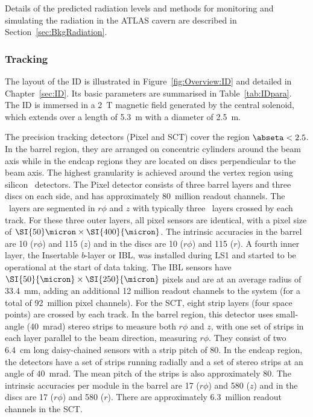 \documentclass[cernpreprint, atlasdraft=false, UKenglish,british,orcidlogo, texmf, orcidlogo]{atlasdoc}
\begin{document}
Details of the predicted \RunThr radiation levels and methods for monitoring and simulating the radiation in the ATLAS cavern are described in Section~\ref{sec:BkgRadiation}.
 
 
 
 
\subsubsection{Tracking}
\label{subsec:OverviewTracking}
The layout of the \gls{ID} is illustrated in Figure~\ref{fig:Overview:ID} and detailed in
Chapter~\ref{sec:ID}. Its
basic parameters  are summarised in Table~\ref{tab:IDpara}.
The \gls{ID} is immersed in a \SI{2}{\tesla} magnetic field generated by the
central solenoid, which extends over a length of \SI{5.3}{\m} with
a diameter of \SI{2.5}{\m}.
 
The precision tracking detectors (\gls{Pixel} and \gls{SCT}) cover
the region $\abseta<2.5$. In the barrel region, they are arranged on concentric
cylinders around the beam axis while in the endcap regions they are located
on discs perpendicular to the beam axis.
The highest granularity is achieved around the vertex
region using silicon \pixel\  detectors. The \ATLAS \gls{Pixel} detector consists of three barrel layers and three discs on each side, and has
approximately 80~million readout channels.  The \pixel\ layers are segmented in $r\phi$ and $z$ with typically
three \pixel\  layers crossed by each track. For these three outer layers, all pixel sensors are identical, with a pixel size of $\SI{50}\micron
\times \SI{400}{\micron}$. The intrinsic accuracies in the barrel
are \SI{10}{\micron} ($r\phi$) and \SI{115}{\micron} ($z$) and in the discs
are \SI{10}{\micron} ($r\phi$) and \SI{115}{\micron} ($r$). A fourth inner layer, the Insertable $b$-layer or \gls{IBL}, was installed during \gls{LS1} and started to be operational at the start of \RunTwo data taking. The \gls{IBL} sensors have $\SI{50}{\micron} \times \SI{250}{\micron}$ pixels and are at an average radius of \SI{33.4}{\mm}, adding an additional 12 million readout channels to the system (for a total of 92~million pixel channels).
For the \gls{SCT}, eight strip layers (four space points) are crossed by each track.
In the barrel region, this detector uses small-angle (\SI{40}{\milli\radian}) stereo strips
to measure both $r\phi$ and $z$, with one set of strips in each layer parallel
to the beam direction, measuring $r\phi$.
They consist of two \SI{6.4}{\cm} long daisy-chained sensors with a strip pitch
of \SI{80}{\micron}. In the endcap region, the detectors have a set of strips running radially and a
set of stereo strips at an angle of \SI{40}{\milli\radian}.  The mean pitch of the strips is also
approximately \SI{80}{\micron}. The intrinsic accuracies per module in the barrel
are \SI{17}{\micron} ($r\phi$) and \SI{580}{\micron} ($z$) and in the discs are
\SI{17}{\micron} ($r\phi$) and \SI{580}{\micron} ($r$).
There are approximately 6.3~million readout channels in the \gls{SCT}.
 
\end{document}
